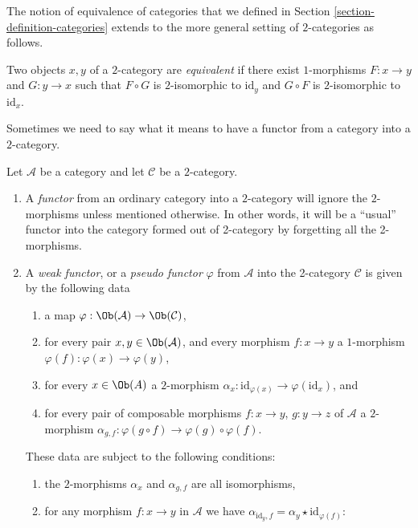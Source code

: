 \noindent
The notion of equivalence of categories that we defined in Section
\ref{section-definition-categories} extends to the more general setting of
$2$-categories as follows.

\begin{definition}
\label{definition-equivalence}
Two objects $x, y$ of a $2$-category are {\it equivalent} if there exist
$1$-morphisms $F : x \to y$ and $G : y \to x$ such that $F \circ G$ is
$2$-isomorphic to $\text{id}_y$ and $G \circ F$ is $2$-isomorphic to
$\text{id}_x$.
\end{definition}

\noindent
Sometimes we need to say what it means to have a functor from a
category into a $2$-category.

\begin{definition}
\label{definition-functor-into-2-category}
Let $\mathcal{A}$ be a category and let $\mathcal{C}$ be a $2$-category.
\begin{enumerate}
\item A {\it functor} from an ordinary category into a $2$-category
will ignore the
$2$-morphisms unless mentioned otherwise. In other words, it will be a
``usual'' functor into the category formed out of 2-category by forgetting
all the 2-morphisms.
\item A {\it weak functor}, or
a {\it pseudo functor} $\varphi$ from $\mathcal{A}$ into the 2-category
$\mathcal{C}$ is given by the following data
\begin{enumerate}
\item a map $\varphi : \Ob(\mathcal{A}) \to \Ob(\mathcal{C})$,
\item for every pair $x, y\in \Ob(\mathcal{A})$, and every
morphism $f : x \to y$ a $1$-morphism $\varphi(f) : \varphi(x) \to \varphi(y)$,
\item for every $x\in \Ob(A)$ a $2$-morphism
$\alpha_x : \text{id}_{\varphi(x)} \to \varphi(\text{id}_x)$, and
\item for every pair of composable morphisms $f : x \to y$,
$g : y \to z$ of $\mathcal{A}$ a $2$-morphism
$\alpha_{g, f} : \varphi(g \circ f) \to \varphi(g) \circ \varphi(f)$.
\end{enumerate}
These data are subject to the following conditions:
\begin{enumerate}
\item the $2$-morphisms $\alpha_x$ and $\alpha_{g, f}$ are all
isomorphisms,
\item for any morphism $f : x \to y$ in $\mathcal{A}$ we have
$\alpha_{\text{id}_y, f} = \alpha_y \star \text{id}_{\varphi(f)}$:

\end{enumerate}
\end{enumerate}
\end{definition}
